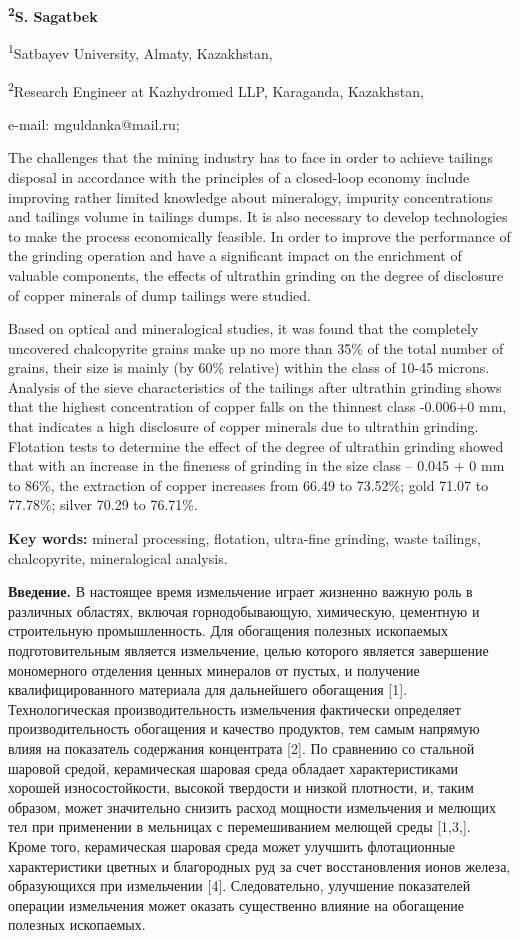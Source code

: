 {\bfseries \textsuperscript{2}S. Sagatbek}

\textsuperscript{1}Satbayev University, Almaty, Kazakhstan,

\textsuperscript{2}Research Engineer at Kazhydromed LLP, Karaganda,
Kazakhstan,

e-mail: mguldanka@mail.ru;

The challenges that the mining industry has to face in order to achieve
tailings disposal in accordance with the principles of a closed-loop
economy include improving rather limited knowledge about mineralogy,
impurity concentrations and tailings volume in tailings dumps. It is
also necessary to develop technologies to make the process economically
feasible. In order to improve the performance of the grinding operation
and have a significant impact on the enrichment of valuable components,
the effects of ultrathin grinding on the degree of disclosure of copper
minerals of dump tailings were studied.

Based on optical and mineralogical studies, it was found that the
completely uncovered chalcopyrite grains make up no more than 35\% of
the total number of grains, their size is mainly (by 60\% relative)
within the class of 10-45 microns. Analysis of the sieve characteristics
of the tailings after ultrathin grinding shows that the highest
concentration of copper falls on the thinnest class -0.006+0 mm, that
indicates a high disclosure of copper minerals due to ultrathin
grinding. Flotation tests to determine the effect of the degree of
ultrathin grinding showed that with an increase in the fineness of
grinding in the size class -- 0.045 + 0 mm to 86\%, the extraction of
copper increases from 66.49 to 73.52\%; gold 71.07 to 77.78\%; silver
70.29 to 76.71\%.

{\bfseries Key words:} mineral processing, flotation, ultra-fine grinding,
waste tailings, chalcopyrite, mineralogical analysis.

{\bfseries Введение.} В настоящее время измельчение играет жизненно важную
роль в различных областях, включая горнодобывающую, химическую,
цементную и строительную промышленность. Для обогащения полезных
ископаемых подготовительным является измельчение, целью которого
является завершение мономерного отделения ценных минералов от пустых, и
получение квалифицированного материала для дальнейшего обогащения
{[}1{]}. Технологическая производительность измельчения фактически
определяет производительность обогащения и качество продуктов, тем самым
напрямую влияя на показатель содержания концентрата {[}2{]}. По
сравнению со стальной шаровой средой, керамическая шаровая среда
обладает характеристиками хорошей износостойкости, высокой твердости и
низкой плотности, и, таким образом, может значительно снизить расход
мощности измельчения и мелющих тел при применении в мельницах с
перемешиванием мелющей среды {[}1,3,{]}. Кроме того, керамическая
шаровая среда может улучшить флотационные характеристики цветных и
благородных руд за счет восстановления ионов железа, образующихся при
измельчении {[}4{]}. Следовательно, улучшение показателей операции
измельчения может оказать существенно влияние на обогащение полезных
ископаемых.

